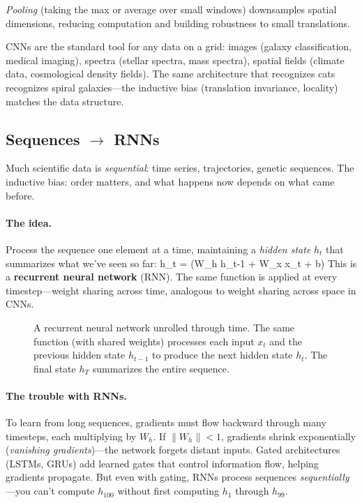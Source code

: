 \documentclass[11pt]{article}
\begin{document}
\emph{Pooling} (taking the max or average over small windows) downsamples spatial dimensions, reducing computation and building robustness to small translations.

CNNs are the standard tool for any data on a grid: images (galaxy classification, medical imaging), spectra (stellar spectra, mass spectra), spatial fields (climate data, cosmological density fields). The same architecture that recognizes cats recognizes spiral galaxies---the inductive bias (translation invariance, locality) matches the data structure.

\subsection{Sequences $\to$ RNNs}

Much scientific data is \emph{sequential}: time series, trajectories, genetic sequences. The inductive bias: order matters, and what happens now depends on what came before.

\paragraph{The idea.} Process the sequence one element at a time, maintaining a \emph{hidden state} $h_t$ that summarizes what we've seen so far:
\beq
h_t = \sigma(W_h h_{t-1} + W_x x_t + b)
\eeq
This is a \textbf{recurrent neural network} (RNN). The same function is applied at every timestep---weight sharing across time, analogous to weight sharing across space in CNNs.

\begin{figure}[h]
\centering

\caption{A recurrent neural network unrolled through time. The same function (with shared weights) processes each input $x_t$ and the previous hidden state $h_{t-1}$ to produce the next hidden state $h_t$. The final state $h_T$ summarizes the entire sequence.}
\label{fig:rnn}
\end{figure}

\paragraph{The trouble with RNNs.} To learn from long sequences, gradients must flow backward through many timesteps, each multiplying by $W_h$. If $\|W_h\| < 1$, gradients shrink exponentially (\emph{vanishing gradients})---the network forgets distant inputs. Gated architectures (LSTMs, GRUs) add learned gates that control information flow, helping gradients propagate. But even with gating, RNNs process sequences \emph{sequentially}---you can't compute $h_{100}$ without first computing $h_1$ through $h_{99}$.
\end{document}
